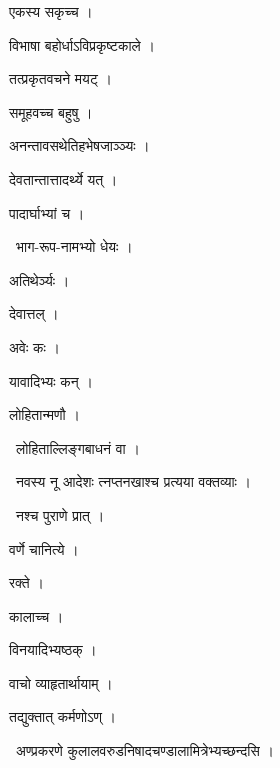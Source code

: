 \documentclass[10pt, openany, oneside]{book}
\begin{document}
\noindent एकस्य सकृच्च ।

\noindent विभाषा बहोर्धाऽविप्रकृष्टकाले ।

\noindent तत्प्रकृतवचने मयट् ।

\noindent समूहवच्च बहुषु ।

\noindent अनन्तावसथेतिहभेषजाञ्ञ्यः ।

\noindent देवतान्तात्तादर्थ्ये यत् ।

\noindent पादार्घाभ्यां च ।

\par\noindent\hspace{1.5em}{\vps वा॰}~{\qt भाग-रूप-नामभ्यो धेयः ।}

\noindent अतिथेर्ञ्यः ।

\noindent देवात्तल् ।

\noindent अवेः कः ।

\noindent यावादिभ्यः कन् ।

\noindent लोहितान्मणौ ।

\par\noindent\hspace{1.5em}{\vps वा॰}~{\qt लोहिताल्लिङ्गबाधनं वा ।}

\par\noindent\hspace{1.5em}{\vps वा॰}~{\qt नवस्य नू आदेशः त्नप्तनखाश्च प्रत्यया वक्तव्याः ।}

\par\noindent\hspace{1.5em}{\vps वा॰}~{\qt नश्च पुराणे प्रात् ।}

\noindent वर्णे चानित्ये ।

\noindent रक्ते ।

\noindent कालाच्च ।

\noindent विनयादिभ्यष्ठक् ।

\noindent वाचो व्याहृतार्थायाम् ।

\noindent तद्युक्तात् कर्मणोऽण् ।

\par\noindent\hspace{1.5em}{\vps वा॰}~{\qt अण्प्रकरणे कुलालवरुडनिषादचण्डालामित्रेभ्यच्छन्दसि ।}
\end{document}
